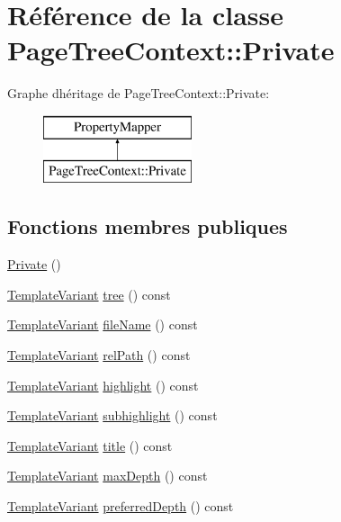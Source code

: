 \hypertarget{class_page_tree_context_1_1_private}{}\section{Référence de la classe Page\+Tree\+Context\+:\+:Private}
\label{class_page_tree_context_1_1_private}
Graphe d\textquotesingle{}héritage de Page\+Tree\+Context\+:\+:Private\+:\begin{figure}[H]
\begin{center}
\leavevmode
\includegraphics[height=2.000000cm]{class_page_tree_context_1_1_private}
\end{center}
\end{figure}
\subsection*{Fonctions membres publiques}
\begin{DoxyCompactItemize}
\item 
\hyperlink{class_page_tree_context_1_1_private_a926158cf915b891e4911cf451edda79e}{Private} ()
\item 
\hyperlink{class_template_variant}{Template\+Variant} \hyperlink{class_page_tree_context_1_1_private_a4dc2e7526afa2b31429191c5f15ff390}{tree} () const 
\item 
\hyperlink{class_template_variant}{Template\+Variant} \hyperlink{class_page_tree_context_1_1_private_a827b06daf5a38b5b2ccdd4c6c6ada0d8}{file\+Name} () const 
\item 
\hyperlink{class_template_variant}{Template\+Variant} \hyperlink{class_page_tree_context_1_1_private_a73ec5272884fa789966edf5623d9d340}{rel\+Path} () const 
\item 
\hyperlink{class_template_variant}{Template\+Variant} \hyperlink{class_page_tree_context_1_1_private_aae74427d9c2ab9c34dab41fc12c54127}{highlight} () const 
\item 
\hyperlink{class_template_variant}{Template\+Variant} \hyperlink{class_page_tree_context_1_1_private_aae7d98cd5794c1ed12b7910baafbed87}{subhighlight} () const 
\item 
\hyperlink{class_template_variant}{Template\+Variant} \hyperlink{class_page_tree_context_1_1_private_a1cb02e5a7e501af0a99c263eb9761c90}{title} () const 
\item 
\hyperlink{class_template_variant}{Template\+Variant} \hyperlink{class_page_tree_context_1_1_private_a0a70844afe99b9cf4b82d6e3eb87b38f}{max\+Depth} () const 
\item 
\hyperlink{class_template_variant}{Template\+Variant} \hyperlink{class_page_tree_context_1_1_private_a076b55a684c574da0860f2834eb2bd70}{preferred\+Depth} () const 
\end{DoxyCompactItemize}


